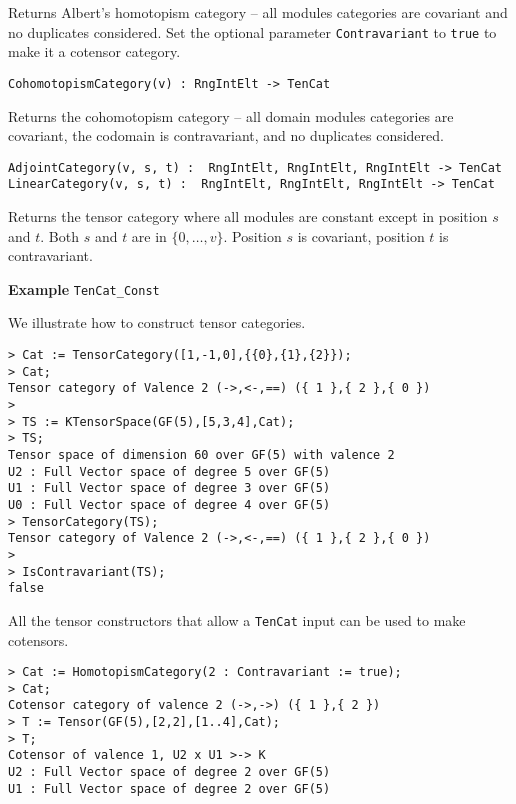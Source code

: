 Returns Albert's homotopism category -- all modules categories are covariant 
and 
no duplicates considered.
Set the optional parameter {\tt Contravariant} to {\tt true} to make it a cotensor category.

\color{blue}
{\small \begin{verbatim}
CohomotopismCategory(v) : RngIntElt -> TenCat
\end{verbatim} }
\color{black}

Returns the cohomotopism category -- all domain modules categories are 
covariant, the codomain is contravariant, and no duplicates considered.

\color{blue}
{\small \begin{verbatim}
AdjointCategory(v, s, t) :  RngIntElt, RngIntElt, RngIntElt -> TenCat
LinearCategory(v, s, t) :  RngIntElt, RngIntElt, RngIntElt -> TenCat
\end{verbatim} }
\color{black}

Returns the tensor category where all modules are constant except in position 
$s$ and $t$.  Both $s$ and $t$ are in $\{0,\dots, v\}$.
Position $s$ is covariant, position $t$ is contravariant.

\begin{framed}{\bf Example} {\tt TenCat\_Const}\\
{\small We illustrate how to construct tensor categories.
\begin{lstlisting}[frame=single,basicstyle=\ttfamily\color{black!30!
teal},backgroundcolor=\color{white!70!gray}]
> Cat := TensorCategory([1,-1,0],{{0},{1},{2}});
> Cat;
Tensor category of Valence 2 (->,<-,==) ({ 1 },{ 2 },{ 0 })
> 
> TS := KTensorSpace(GF(5),[5,3,4],Cat);
> TS;
Tensor space of dimension 60 over GF(5) with valence 2
U2 : Full Vector space of degree 5 over GF(5)
U1 : Full Vector space of degree 3 over GF(5)
U0 : Full Vector space of degree 4 over GF(5)
> TensorCategory(TS);
Tensor category of Valence 2 (->,<-,==) ({ 1 },{ 2 },{ 0 })
> 
> IsContravariant(TS);
false
\end{lstlisting}
All the tensor constructors that allow a {\tt TenCat} input can be used to make cotensors.
\begin{lstlisting}[frame=single,basicstyle=\ttfamily\color{black!30!
teal},backgroundcolor=\color{white!70!gray}]
> Cat := HomotopismCategory(2 : Contravariant := true);
> Cat;
Cotensor category of valence 2 (->,->) ({ 1 },{ 2 })
> T := Tensor(GF(5),[2,2],[1..4],Cat);
> T;
Cotensor of valence 1, U2 x U1 >-> K
U2 : Full Vector space of degree 2 over GF(5)
U1 : Full Vector space of degree 2 over GF(5)
\end{lstlisting}
}
\end{framed}

